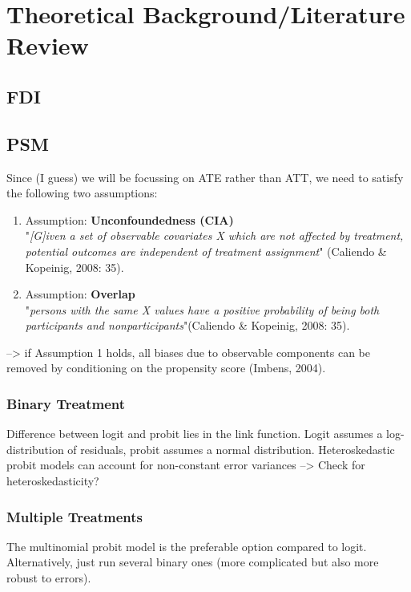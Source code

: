 \documentclass[a4paper,12pt]{scrartcl}
\begin{document}
\section{Theoretical Background/Literature Review}

\subsection{FDI}

\subsection{PSM}
Since (I guess) we will be focussing on ATE rather than ATT, we need to satisfy the following two assumptions: 

\begin{enumerate}
\item Assumption: \textbf{Unconfoundedness (CIA)} \\
"\textit{[G]iven a set of observable covariates X which are not affected by treatment, potential outcomes are independent of treatment assignment}" (Caliendo \& Kopeinig, 2008: 35).

\item Assumption: \textbf{Overlap} \\
"\textit{persons with the same X values have a positive probability of being both participants and nonparticipants}"(Caliendo \& Kopeinig, 2008: 35).

\end{enumerate}
--> if Assumption 1 holds, all biases due to observable components can be removed by conditioning on the propensity score (Imbens, 2004).

\subsubsection*{Binary Treatment}
Difference between logit and probit lies in the link function. Logit assumes a log-distribution of residuals, probit assumes a normal distribution. Heteroskedastic probit models can account for non-constant error variances --> Check for heteroskedasticity?

\subsubsection*{Multiple Treatments}
The multinomial probit model is the preferable option compared to logit. Alternatively, just run several binary ones (more complicated but also more robust to errors).
\end{document}
